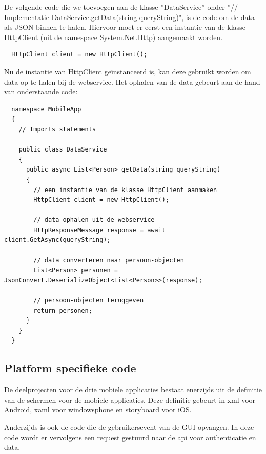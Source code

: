 De volgende code die we toevoegen aan de klasse ''DataService'' onder ''// Implementatie DataService.getData(string queryString)", is de code om de data als JSON binnen te halen.
Hiervoor moet er eerst een instantie van de klasse HttpClient (uit de namespace System.Net.Http) aangemaakt worden.
\begin{lstlisting}
  HttpClient client = new HttpClient();
\end{lstlisting}
\newpage
Nu de instantie van HttpClient geïnstanceerd is, kan deze gebruikt worden om data op te halen bij de webservice.
Het ophalen van de data gebeurt aan de hand van onderstaande code:
\begin{lstlisting}
  namespace MobileApp
  {
    // Imports statements

    public class DataService
    {
      public async List<Person> getData(string queryString)
      {
        // een instantie van de klasse HttpClient aanmaken
        HttpClient client = new HttpClient();

        // data ophalen uit de webservice
        HttpResponseMessage response = await client.GetAsync(queryString);

        // data converteren naar persoon-objecten
        List<Person> personen = JsonConvert.DeserializeObject<List<Person>>(response);

        // persoon-objecten teruggeven
        return personen;
      }
    }
  }
\end{lstlisting}



\subsection{Platform specifieke code}
De deelprojecten voor de drie mobiele applicaties bestaat enerzijds uit de definitie van de schermen voor de mobiele applicaties.
Deze definitie gebeurt in xml voor Android, xaml voor windowsphone en storyboard voor iOS.

Anderzijds is ook de code die de gebruikersevent van de GUI opvangen. In deze code wordt er vervolgens een request gestuurd naar
de api voor authenticatie en data.
